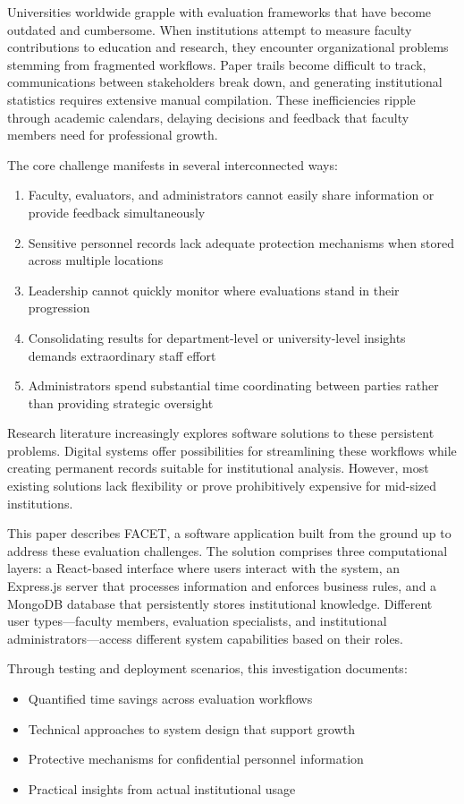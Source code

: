 \documentclass[conference]{IEEEtran}
\begin{document}
Universities worldwide grapple with evaluation frameworks that have become outdated and cumbersome. When institutions attempt to measure faculty contributions to education and research, they encounter organizational problems stemming from fragmented workflows. Paper trails become difficult to track, communications between stakeholders break down, and generating institutional statistics requires extensive manual compilation. These inefficiencies ripple through academic calendars, delaying decisions and feedback that faculty members need for professional growth.

The core challenge manifests in several interconnected ways:

\begin{enumerate}
\item Faculty, evaluators, and administrators cannot easily share information or provide feedback simultaneously
\item Sensitive personnel records lack adequate protection mechanisms when stored across multiple locations
\item Leadership cannot quickly monitor where evaluations stand in their progression
\item Consolidating results for department-level or university-level insights demands extraordinary staff effort
\item Administrators spend substantial time coordinating between parties rather than providing strategic oversight
\end{enumerate}

Research literature increasingly explores software solutions to these persistent problems. Digital systems offer possibilities for streamlining these workflows while creating permanent records suitable for institutional analysis. However, most existing solutions lack flexibility or prove prohibitively expensive for mid-sized institutions.

This paper describes FACET, a software application built from the ground up to address these evaluation challenges. The solution comprises three computational layers: a React-based interface where users interact with the system, an Express.js server that processes information and enforces business rules, and a MongoDB database that persistently stores institutional knowledge. Different user types---faculty members, evaluation specialists, and institutional administrators---access different system capabilities based on their roles.

Through testing and deployment scenarios, this investigation documents:
\begin{itemize}
\item Quantified time savings across evaluation workflows
\item Technical approaches to system design that support growth
\item Protective mechanisms for confidential personnel information
\item Practical insights from actual institutional usage
\end{itemize}
\end{document}
